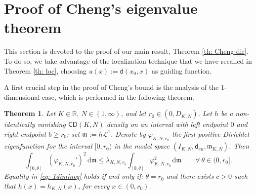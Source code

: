 \documentclass[12pt]{article}
\newcommand{\dd}{\mathrm{d}}
\newcommand{\mm}{\mathfrak m}
\newcommand{\di}{\mathsf{d}}
\theoremstyle{plain}
\newtheorem{theorem}[lemma]{Theorem}
\theoremstyle{definition}
\begin{document}
\section{Proof of Cheng's eigenvalue theorem}\label{sec: proof Cheng}
This section is devoted to the proof of our main result, Theorem \ref{th: Cheng dir}. To do so, we take advantage of the localization technique that we have recalled in Theorem \ref{th: loc}, choosing $u(x):=\di(x_0,x)$ as guiding function.

A first crucial step in the proof of Cheng's bound is the analysis of the $1$-dimensional case, which is performed in the following theorem.
\begin{theorem}\label{th: 1dim}
Let $K\in \mathbb{R}$, $N\in(1,\infty)$, and let $r_0\in (0,D_{K,N})$. Let $h$ be a non-identically vanishing $\mathsf{CD}(K,N)$ density on an interval with left endpoint $0$ and right endpoint $b\ge r_0$; set $\mm:=h\mathcal{L}^1$. Denote by $\varphi_{K,N,r_0}$ the first positive Dirichlet eigenfunction for the interval $[0,r_0)$ in the model space $(I_{K,N},\di_{eu},\mm_{K,N})$. Then
\begin{equation}\label{eq: 1dimineq}
\int_{[0,\theta]}(\varphi_{K,N,r_0}')^2\,\dd \mm\le \lambda_{K,N,r_0}\int_{[0,\theta]}\varphi_{K,N,r_0}^2\,\dd \mm \qquad \forall \ \theta\in(0,r_0].
\end{equation}
Equality in \eqref{eq: 1dimineq} holds if and only if: 
 $\theta=r_0$ and there exists $c>0$ such that $h(x)=h_{K,N}(x)$, for every $x\in (0,r_0)$.



\end{theorem}
\end{document}
